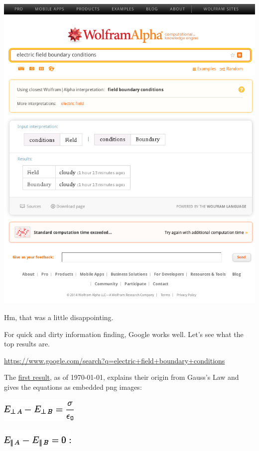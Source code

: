 \documentclass[12pt,letterpaper]{article}
\begin{document}
\begin{center}
\includegraphics[scale=0.7]{wolfram-alpha-electric-field-boundary-conditions.png}
\end{center}

Hm, that was a little disappointing.

For quick and dirty information finding,
Google works well.
Let's see what the top results are.

\url{https://www.google.com/search?q=electric+field+boundary+conditions}

The
\href{http://farside.ph.utexas.edu/teaching/em/lectures/node59.html}
{first result}, as of \today,
explains their origin from Gauss's Law
and gives the equations as embedded png images:

\begin{center}
\includegraphics[scale=0.5]{img1337.png}

\includegraphics[scale=0.5]{img1344.png}
\end{center}
\end{document}
